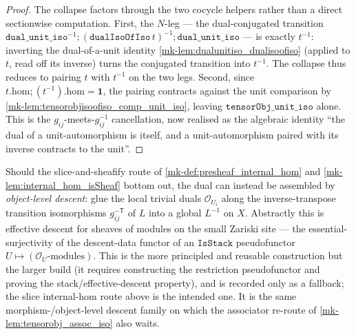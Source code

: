 \begin{proof}
  \leanok
  The collapse factors through the two cocycle helpers rather than a direct sectionwise computation.
  First, the \(N\)-leg --- the dual-conjugated transition
  \(\mathtt{dual\_unit\_iso}^{-1} \mathbin{;} (\mathtt{dualIsoOfIso}\,t)^{-1} \mathbin{;}
  \mathtt{dual\_unit\_iso}\) --- is exactly \(t^{-1}\): inverting the dual-of-a-unit identity
  \ref{mk-lem:dualunitiso_dualisoofiso} (applied to \(t\), read off its inverse) turns the conjugated
  transition into \(t^{-1}\). The collapse thus reduces to pairing \(t\) with \(t^{-1}\) on the two
  legs. Second, since \(t.\mathrm{hom} \mathbin{;} (t^{-1}).\mathrm{hom} = \mathbf 1\), the pairing
  contracts against the unit comparison by \ref{mk-lem:tensorobjisoofiso_comp_unit_iso}, leaving
  \(\mathtt{tensorObj\_unit\_iso}\) alone. This is the \(g_{ij}\)-meets-\(g_{ij}^{-1}\) cancellation,
  now realised as the algebraic identity ``the dual of a unit-automorphism is itself, and a
  unit-automorphism paired with its inverse contracts to the unit''.
\end{proof}

\begin{remark}
  \label{mk-rem:dual_via_stack}
  Should the slice-and-sheafify route of
  \ref{mk-def:presheaf_internal_hom} and \ref{mk-lem:internal_hom_isSheaf} bottom out, the dual can
  instead be assembled by \emph{object-level descent}: glue the local trivial duals
  \(\mathcal{O}_{U_i}\) along the inverse-transpose transition isomorphisms
  \(g_{ij}^{-\mathsf{T}}\) of \(L\) into a global \(L^{-1}\) on \(X\). Abstractly this
  is effective descent for sheaves of modules on the small Zariski site --- the
  essential-surjectivity of the descent-data functor of an \(\mathtt{IsStack}\)
  pseudofunctor \(U \mapsto (\mathcal{O}_U\text{-modules})\). This is the more
  principled and reusable construction but the larger build (it requires constructing
  the restriction pseudofunctor and proving the stack/effective-descent property),
  and is recorded only as a fallback; the slice internal-hom route above is the
  intended one. It is the same morphism-/object-level descent family on which the
  associator re-route of \ref{mk-lem:tensorobj_assoc_iso} also waits.
\end{remark}

